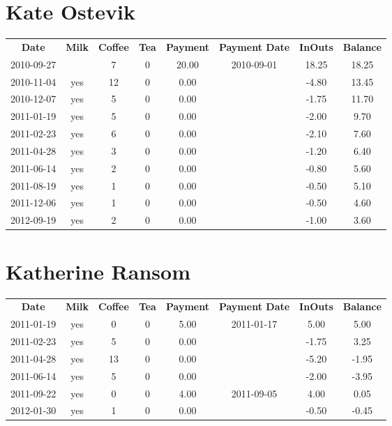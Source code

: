 \section{Kate Ostevik}

\begin{center}
\begin{tabular}{cccccccc}
\textbf{Date} & \textbf{Milk} & \textbf{Coffee} & \textbf{Tea} & \textbf{Payment} & \textbf{Payment Date} & \textbf{InOuts} & \textbf{Balance} \\
2010-09-27 &  &  7 & 0 & 20.00 & 2010-09-01 & 18.25 & 18.25\\ 
2010-11-04 & yes & 12 & 0 &  0.00 &  & -4.80 & 13.45\\ 
2010-12-07 & yes &  5 & 0 &  0.00 &  & -1.75 & 11.70\\ 
2011-01-19 & yes &  5 & 0 &  0.00 &  & -2.00 &  9.70\\ 
2011-02-23 & yes &  6 & 0 &  0.00 &  & -2.10 &  7.60\\ 
2011-04-28 & yes &  3 & 0 &  0.00 &  & -1.20 &  6.40\\ 
2011-06-14 & yes &  2 & 0 &  0.00 &  & -0.80 &  5.60\\ 
2011-08-19 & yes &  1 & 0 &  0.00 &  & -0.50 &  5.10\\ 
2011-12-06 & yes &  1 & 0 &  0.00 &  & -0.50 &  4.60\\ 
2012-09-19 & yes &  2 & 0 &  0.00 &  & -1.00 &  3.60
\end{tabular}
\end{center}

\section{Katherine Ransom}

\begin{center}
\begin{tabular}{cccccccc}
\textbf{Date} & \textbf{Milk} & \textbf{Coffee} & \textbf{Tea} & \textbf{Payment} & \textbf{Payment Date} & \textbf{InOuts} & \textbf{Balance} \\
2011-01-19 & yes &  0 & 0 & 5.00 & 2011-01-17 &  5.00 &  5.00\\ 
2011-02-23 & yes &  5 & 0 & 0.00 &  & -1.75 &  3.25\\ 
2011-04-28 & yes & 13 & 0 & 0.00 &  & -5.20 & -1.95\\ 
2011-06-14 & yes &  5 & 0 & 0.00 &  & -2.00 & -3.95\\ 
2011-09-22 & yes &  0 & 0 & 4.00 & 2011-09-05 &  4.00 &  0.05\\ 
2012-01-30 & yes &  1 & 0 & 0.00 &  & -0.50 & -0.45
\end{tabular}
\end{center}

